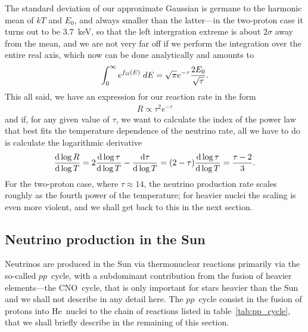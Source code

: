 The standard deviation of our approximate Gaussian is germane to the harmonic mean
of $kT$ and $E_0$, and always smaller than the latter---in the two-proton case it
turns out to be $3.7$~keV, so that the left intergration extreme is about
$2\sigma$ away from the mean, and we are not very far off if we perform the integration
over the entire real axis, which now can be done analytically and amounts to
\begin{align*}
  \int_0^\infty e^{f_G(E)} \;d{E} = \sqrt{\pi} e^{-\tau} \frac{2E_0}{\sqrt{\tau}}.
\end{align*}
This all said, we have an expression for our reaction rate in the form
\begin{align}
  R \propto \tau^2 e^{-\tau}
\end{align}
and if, for any given value of $\tau$, we want to calculate the index of the power
law that best fits the temperature dependence of the neutrino rate, all we have
to do is calculate the logarithmic derivative
\begin{align}
  \dv{\log R}{\log T} = 2 \dv{\log \tau}{\log T} - \dv{\tau}{\log T} =
  (2 - \tau) \dv{\log \tau}{\log T} = \frac{\tau - 2}{3}.
\end{align}
For the two-proton case, where $\tau \approx 14$, the neutrino production rate scales
roughly as the fourth power of the temperature; for heavier nuclei the scaling is
even more violent, and we shall get back to this in the next section.


\subsection{Neutrino production in the Sun}

Neutrinos are produced in the Sun via thermonuclear reactions primarily via the
so-called $pp$~cycle, with a subdominant contribution from the fusion of heavier
elements---the CNO~cycle, that is only important for stars heavier than the Sun
and we shall not describe in any detail here. The $pp$~cycle consist in the fusion
of protons into He~nuclei to the chain of reactions listed in table~\ref{tab:pp_cycle},
that we shall briefly describe in the remaining of this section.


